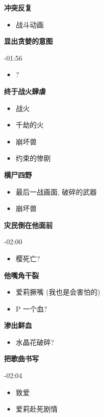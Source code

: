 \documentclass[a4paper]{article}
\begin{document}
\textbf{冲突反复}

\begin{itemize}
    \item 战斗动画
\end{itemize}

\textbf{显出贪婪的意图}

-01:56

\begin{itemize}
    \item ?
\end{itemize}

\textbf{终于战火肆虐}

\begin{itemize}
    \item 战火
    \item 千劫的火
    \item 崩坏兽
    \item 约束的惨剧
\end{itemize}

\textbf{横尸四野}

\begin{itemize}
    \item 最后一战画面, 破碎的武器
    \item 崩坏兽
\end{itemize}

\textbf{灾民倒在他面前}

-02:00

\begin{itemize}
    \item 樱死亡?
\end{itemize}

\textbf{他嘴角干裂}

\begin{itemize}
    \item 爱莉撅嘴 (我也是会害怕的)
    \item P 一个血?
\end{itemize}

\textbf{渗出鲜血}

\begin{itemize}
    \item 水晶花破碎?
\end{itemize}

\textbf{把歌曲书写}

-02:04

\begin{itemize}
    \item 致爱
    \item 爱莉赴死剧情
\end{itemize}
\end{document}
